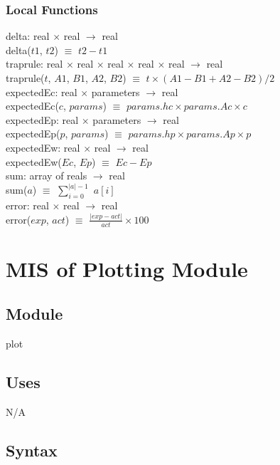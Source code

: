 \documentclass[12pt]{article}
\begin{document}
\subsubsection{Local Functions}
delta: real $\times$ real $\rightarrow$ real \\
delta($t1$, $t2$) $\equiv$ $t2 - t1$ \\
\newline
traprule: real $\times$ real $\times$ real $\times$ real $\times$ real $\rightarrow$ real \\
traprule($t$, $A1$, $B1$, $A2$, $B2$) $\equiv$ $t \times (A1 - B1 + A2 - B2) / 2$ \\
\newline
expectedEc: real $\times$ parameters $\rightarrow$ real \\
expectedEc($c$, $params$) $\equiv$ $params.hc \times params.Ac \times c$ \\
\newline
expectedEp: real $\times$ parameters $\rightarrow$ real \\
expectedEp($p$, $params$) $\equiv$ $params.hp \times params.Ap \times p$ \\
\newline
expectedEw: real $\times$ real $\rightarrow$ real \\
expectedEw($Ec$, $Ep$) $\equiv$ $Ec - Ep$ \\
\newline
sum: array of reals $\rightarrow$ real \\
sum($a$) $\equiv$ $\sum_{i=0}^{|a| - 1}$ $a[i]$ \\
\newline
error: real $\times$ real $\rightarrow$ real \\
error($exp$, $act$) $\equiv$ $\frac{|exp - act|}{act} \times 100$ \\

\section{MIS of Plotting Module} \label{Plot}
\subsection{Module}
plot
\subsection{Uses}
N/A
\subsection{Syntax}
\end{document}
